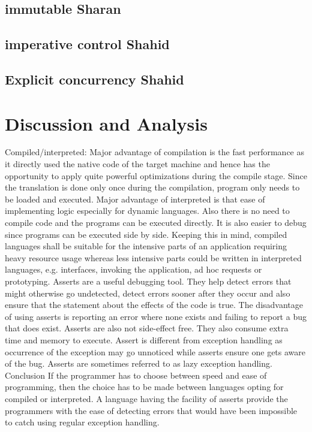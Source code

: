 \documentclass{sig-alternate}
\begin{document}
\subsection{immutable Sharan}
\subsection{imperative control Shahid}
\subsection{Explicit concurrency Shahid}

\section{Discussion and Analysis}
Compiled/interpreted: Major advantage of compilation is the fast performance as it directly used the native code of the target machine and hence has the opportunity to apply quite powerful optimizations during the compile stage. Since the translation is done only once during the compilation, program only needs to be loaded and executed. Major advantage of interpreted is that ease of implementing logic especially for dynamic languages. Also there is no need to compile code and the programs can be executed directly. It is also easier to debug since programs can be executed side by side. Keeping this in mind, compiled languages shall be suitable for the intensive parts of an application requiring heavy resource usage whereas less intensive parts could be written in interpreted languages, e.g. interfaces, invoking the application, ad hoc requests or prototyping.
Asserts are a useful debugging tool. They help detect errors that might otherwise go undetected, detect errors sooner after they occur and also ensure that the statement about the effects of the code is true. The disadvantage of using asserts is reporting an error where none exists and failing to report a bug that does exist. Asserts are also not side-effect free. They also consume extra time and memory to execute. Assert is different from exception handling as occurrence of the exception may go unnoticed while asserts ensure one gets aware of the bug. Asserts are sometimes referred to as lazy exception handling.
Conclusion
If the programmer has to choose between speed and ease of programming, then the choice has to be made between languages opting for compiled or interpreted. A language having the facility of asserts provide the programmers with the ease of detecting errors that would have been impossible to catch using regular exception handling.
\end{document}
